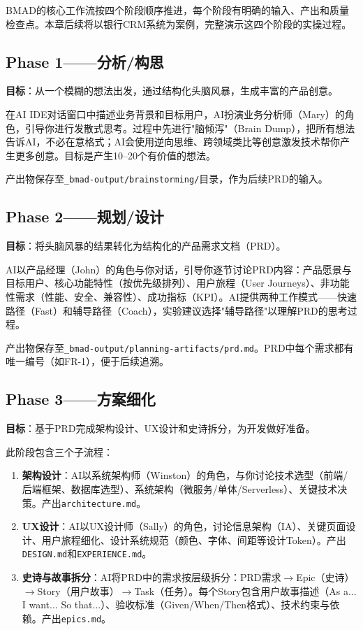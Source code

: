 BMAD的核心工作流按四个阶段顺序推进，每个阶段有明确的输入、产出和质量检查点。本章后续将以银行CRM系统为案例，完整演示这四个阶段的实操过程。

\subsection{Phase 1——分析/构思}

\textbf{目标}：从一个模糊的想法出发，通过结构化头脑风暴，生成丰富的产品创意。

在AI IDE对话窗口中描述业务背景和目标用户，AI扮演业务分析师（Mary）的角色，引导你进行发散式思考。过程中先进行"脑倾泻"（Brain Dump），把所有想法告诉AI，不必在意格式；AI会使用逆向思维、跨领域类比等创意激发技术帮你产生更多创意。目标是产生10--20个有价值的想法。

产出物保存至\texttt{\_bmad-output/brainstorming/}目录，作为后续PRD的输入。

\subsection{Phase 2——规划/设计}

\textbf{目标}：将头脑风暴的结果转化为结构化的产品需求文档（PRD）。

AI以产品经理（John）的角色与你对话，引导你逐节讨论PRD内容：产品愿景与目标用户、核心功能特性（按优先级排列）、用户旅程（User Journeys）、非功能性需求（性能、安全、兼容性）、成功指标（KPI）。AI提供两种工作模式——快速路径（Fast）和辅导路径（Coach），实验建议选择"辅导路径"以理解PRD的思考过程。

产出物保存至\texttt{\_bmad-output/planning-artifacts/prd.md}。PRD中每个需求都有唯一编号（如FR-1），便于后续追溯。

\subsection{Phase 3——方案细化}

\textbf{目标}：基于PRD完成架构设计、UX设计和史诗拆分，为开发做好准备。

此阶段包含三个子流程：

\begin{enumerate}[leftmargin=2em]
  \item \textbf{架构设计}：AI以系统架构师（Winston）的角色，与你讨论技术选型（前端/后端框架、数据库选型）、系统架构（微服务/单体/Serverless）、关键技术决策。产出\texttt{architecture.md}。
  \item \textbf{UX设计}：AI以UX设计师（Sally）的角色，讨论信息架构（IA）、关键页面设计、用户旅程细化、设计系统规范（颜色、字体、间距等设计Token）。产出\texttt{DESIGN.md}和\texttt{EXPERIENCE.md}。
  \item \textbf{史诗与故事拆分}：AI将PRD中的需求按层级拆分：PRD需求$\to$Epic（史诗）$\to$Story（用户故事）$\to$Task（任务）。每个Story包含用户故事描述（As a... I want... So that...）、验收标准（Given/When/Then格式）、技术约束与依赖。产出\texttt{epics.md}。
\end{enumerate}

